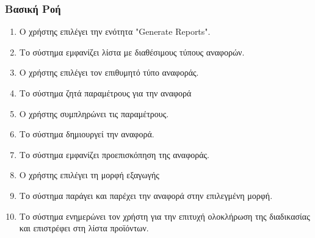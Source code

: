 \documentclass[12pt,a4paper,twoside]{book}
\begin{document}
\subsubsection{Βασική Ροή}
\begin{enumerate}
  \item Ο χρήστης επιλέγει την ενότητα "Generate Reports". %
  \item Το σύστημα εμφανίζει λίστα με διαθέσιμους τύπους αναφορών.
  \item Ο χρήστης επιλέγει τον επιθυμητό τύπο αναφοράς.
  \item Το σύστημα ζητά παραμέτρους για την αναφορά%
  \item Ο χρήστης συμπληρώνει τις παραμέτρους.
  \item Το σύστημα δημιουργεί την αναφορά.
  \item Το σύστημα εμφανίζει προεπισκόπηση της αναφοράς.
  \item Ο χρήστης επιλέγει τη μορφή εξαγωγής %
  \item Το σύστημα παράγει και παρέχει την αναφορά στην επιλεγμένη μορφή.
  \item Το σύστημα ενημερώνει τον χρήστη για την επιτυχή ολοκλήρωση της διαδικασίας και επιστρέφει στη λίστα προϊόντων.
\end{enumerate}
\end{document}
